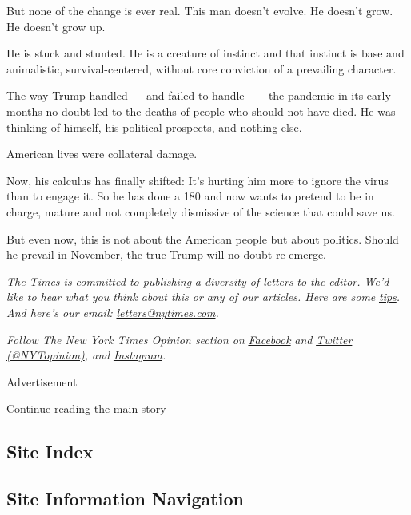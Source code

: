 But none of the change is ever real. This man doesn't evolve. He doesn't
grow. He doesn't grow up.

He is stuck and stunted. He is a creature of instinct and that instinct
is base and animalistic, survival-centered, without core conviction of a
prevailing character.

The way Trump handled --- and failed to handle ---~ the pandemic in its
early months no doubt led to the deaths of people who should not have
died. He was thinking of himself, his political prospects, and nothing
else.

American lives were collateral damage.

Now, his calculus has finally shifted: It's hurting him more to ignore
the virus than to engage it. So he has done a 180 and now wants to
pretend to be in charge, mature and not completely dismissive of the
science that could save us.

But even now, this is not about the American people but about politics.
Should he prevail in November, the true Trump will no doubt re-emerge.

\emph{The Times is committed to publishing}
\href{https://www.nytimes.com/2019/01/31/opinion/letters/letters-to-editor-new-york-times-women.html}{\emph{a
diversity of letters}} \emph{to the editor. We'd like to hear what you
think about this or any of our articles. Here are some}
\href{https://help.nytimes.com/hc/en-us/articles/115014925288-How-to-submit-a-letter-to-the-editor}{\emph{tips}}\emph{.
And here's our email:}
\href{mailto:letters@nytimes.com}{\emph{letters@nytimes.com}}\emph{.}

\emph{Follow The New York Times Opinion section on}
\href{https://www.facebook.com/nytopinion}{\emph{Facebook}} \emph{and}
\href{http://twitter.com/NYTOpinion}{\emph{Twitter
(@NYTopinion)}}\emph{, and}
\href{https://www.instagram.com/nytopinion/}{\emph{Instagram}}\emph{.}

Advertisement

\protect\hyperlink{after-bottom}{Continue reading the main story}

\hypertarget{site-index}{%
\subsection{Site Index}\label{site-index}}

\hypertarget{site-information-navigation}{%
\subsection{Site Information
Navigation}\label{site-information-navigation}}

